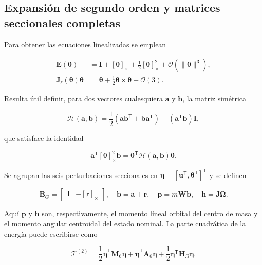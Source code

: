 \subsection{Expansión de segundo orden y matrices seccionales completas}
\label{prefgyro:segundo-orden}

Para obtener las ecuaciones linealizadas se emplean

\begin{align}
 \bm E(\bm\theta)
 & =\bm I+[\bm\theta]_\times
 +\frac12[\bm\theta]_\times^2
 +\mathcal O(\lVert\bm\theta\rVert^3),
 \label{prefgyro:exp2}\\
 \bm J_\ell(\bm\theta)\dot{\bm\theta}
 & =\dot{\bm\theta}
 +\frac12\bm\theta\times\dot{\bm\theta}
 +\mathcal O(3).
 \label{prefgyro:Jleft2}
\end{align}

Resulta útil definir, para dos vectores cualesquiera $\bm a$ y $\bm b$, la
matriz simétrica

\begin{equation}
 \mathcal H(\bm a,\bm b)
 =\frac12\left(\bm a\bm b^{\mathsf T}
 +\bm b\bm a^{\mathsf T}\right)
 -(\bm a^{\mathsf T}\bm b)\bm I,
 \label{prefgyro:Hab}
\end{equation}

que satisface la identidad

\begin{equation}
 \bm a^{\mathsf T}[\bm\theta]_\times^2\bm b
 =\bm\theta^{\mathsf T}\mathcal H(\bm a,\bm b)\bm\theta.
 \label{prefgyro:Hidentity}
\end{equation}

Se agrupan las seis perturbaciones seccionales en
$\bm\eta=[\bm u^{\mathsf T},\bm\theta^{\mathsf T}]^{\mathsf T}$ y se definen

\begin{equation}
 \bm B_G=\begin{bmatrix}\bm I&-[\bm r]_\times\end{bmatrix},
 \quad
 \bm b=\bm a+\bm r,
 \quad
 \bm p=m\bm W\bm b,
 \quad
 \bm h=\bm J\bm\Omega .
 \label{prefgyro:definiciones}
\end{equation}

Aquí $\bm p$ y $\bm h$ son, respectivamente, el momento lineal orbital del
centro de masa y el momento angular centroidal del estado nominal. La parte
cuadrática de la energía puede escribirse como

\begin{equation}
 \mathcal T^{(2)}
 =\frac12\dot{\bm\eta}^{\mathsf T}\bm M_6\dot{\bm\eta}
 +\dot{\bm\eta}^{\mathsf T}\bm A_6\bm\eta
 +\frac12\bm\eta^{\mathsf T}\bm H_\Omega\bm\eta .
 \label{prefgyro:T2}
\end{equation}

